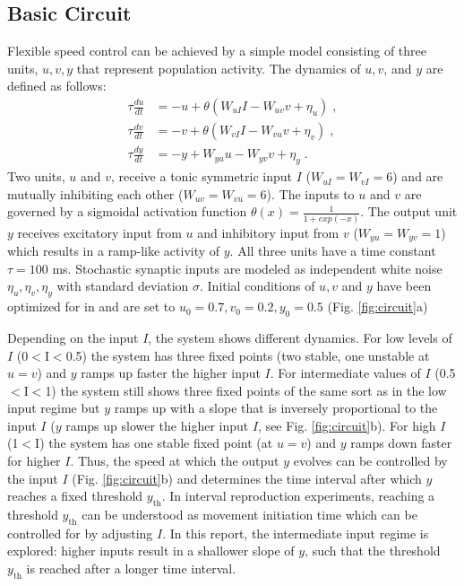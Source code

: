 \documentclass[10pt]{article}
\begin{document}
\subsection{Basic Circuit}
Flexible speed control can be achieved by a simple model consisting of three units, $u, v, y$ that represent population activity. 
The dynamics of $u, v$, and $y$ are defined as follows:
\begin{equation} \label{circuit}
	\begin{split}
	\tau\frac{du}{dt} & = -u + \theta(W_{uI}I - W_{uv}v + \eta_u) \;, \\
	\tau\frac{dv}{dt} & = -v + \theta(W_{vI}I - W_{vu}v + \eta_v) \;, \\
	\tau\frac{dy}{dt} & = -y + W_{yu}u - W_{yv}v + \eta_y \;.
	\end{split}
\end{equation}
Two units, $u$ and $v$, receive a tonic symmetric input $I$ ($W_{uI}=W_{vI}=6$) and are mutually inhibiting each other ($W_{uv}=W_{vu}=6$). 
The inputs to $u$ and $v$ are governed by a sigmoidal activation function $\theta(x) = \frac{1}{1+exp(-x)}$.
The output unit $y$ receives excitatory input from $u$ and inhibitory input from $v$ ($W_{yu}=W_{yv}=1$) which results in a ramp-like activity of $y$.
All three units have a time constant $\tau = 100$ ms. 
Stochastic synaptic inputs are modeled as independent white noise $\eta_u, \eta_v, \eta_y$ with standard deviation $\sigma$.
Initial conditions of $u, v$ and $y$ have been optimized for in \cite{Egger2020} and are set to $u_0=0.7 , v_0=0.2 , y_0=0.5$ (Fig. \ref{fig:circuit}a)

Depending on the input $I$, the system shows different dynamics. For low levels of $I$ (0$<$I$<$0.5) the system has three fixed points (two stable, one unstable at $u=v$) and $y$ ramps up faster the higher input $I$. 
For intermediate values of $I$ (0.5$<$I$<$1) the system still shows three fixed points of the same sort as in the low input regime but $y$ ramps up with a slope that is inversely proportional to the input $I$ ($y$ ramps up slower the higher input $I$, see Fig. \ref{fig:circuit}b). 
For high $I$ (1$<$I) the system has one stable fixed point (at $u=v$) and $y$ ramps down faster for higher $I$.
Thus, the speed at which the output $y$ evolves can be controlled by the input $I$ (Fig. \ref{fig:circuit}b) and determines the time interval after which $y$ reaches a fixed threshold $y_{\text{th}}$. 
In interval reproduction experiments, reaching a threshold $y_{\text{th}}$ can be understood as movement initiation time which can be controlled for by adjusting $I$.
In this report, the intermediate input regime is explored: higher inputs result in a shallower slope of $y$, such that the threshold $y_{\text{th}}$ is reached after a longer time interval.
\end{document}
